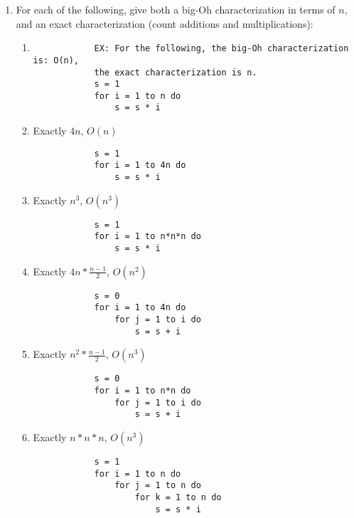 \documentclass[11pt]{article}
\begin{document}
\begin{enumerate}[leftmargin=*]
        \item For each of the following, give both a big-Oh characterization in terms of $n$, and an exact characterization (count additions and multiplications):
            \begin{enumerate}
            \item
            \begin{verbatim}
            EX: For the following, the big-Oh characterization is: O(n), 
            the exact characterization is n.
            s = 1
            for i = 1 to n do
                s = s * i
            \end{verbatim}
            \item Exactly $4n$, $O(n)$
            \begin{verbatim}
            s = 1
            for i = 1 to 4n do
                s = s * i
            \end{verbatim}
            \item Exactly $n^3$, $O(n^3)$
            \begin{verbatim}
            s = 1
            for i = 1 to n*n*n do
                s = s * i
            \end{verbatim}
            \item Exactly $4n * \frac{n-1}{2}$, $O(n^2)$
            \begin{verbatim}
            s = 0
            for i = 1 to 4n do
                for j = 1 to i do
                    s = s + i
            \end{verbatim}
            \item Exactly $n^2 * \frac{n-1}{2}$, $O(n^3)$
            \begin{verbatim}
            s = 0
            for i = 1 to n*n do
                for j = 1 to i do
                    s = s + i
            \end{verbatim}
            \item Exactly $n*n*n$, $O(n^3)$
            \begin{verbatim}
            s = 1
            for i = 1 to n do
                for j = 1 to n do
                    for k = 1 to n do
                        s = s * i
            \end{verbatim}
        \end{enumerate}
    

\end{enumerate}
\end{document}
